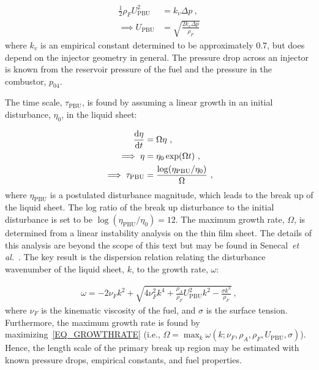 \begin{equation}
	\begin{aligned}
    	\frac{1}{2}\rho_FU_\mathrm{PBU}^2&=k_v\Delta p\ ,\\
        \implies U_\mathrm{PBU}&=\sqrt{\frac{2k_v\Delta p}{\rho_F}}
    \end{aligned}
\end{equation}
where $k_v$ is an empirical constant determined to be approximately 0.7, but does depend on the injector geometry in general. The pressure drop across an injector is known from the reservoir pressure of the fuel and the pressure in the combustor, $p_{04}$.

The time scale, $\tau_\mathrm{PBU}$, is found by assuming a linear growth in an initial disturbance, $\eta_0$, in the liquid sheet:

\begin{equation}
	\begin{aligned}
    	\frac{\d \eta}{\d t}&=\Omega\eta\ ,\\
    	\implies \eta&=\eta_0\exp(\Omega t)\ ,\\
        \implies \tau_\mathrm{PBU}&=\frac{\log(\eta_{\mathrm{PBU}}/\eta_0)}{\Omega}\ ,
    \end{aligned}
\end{equation}
where $\eta_\mathrm{PBU}$ is a postulated disturbance magnitude, which leads to the break up of the liquid sheet. The log ratio of the break up disturbance to the initial disturbance is set to be $\log(\eta_{\mathrm{PBU}}/\eta_0)=12$. The maximum growth rate, $\Omega$, is determined from a linear instability analysis on the thin film sheet. The details of this analysis are beyond the scope of this text but may be found in Senecal~\emph{et al.}~\cite{SENECAL_IJMF99}. The key result is the dispersion relation relating the disturbance wavenumber of the liquid sheet, $k$, to the growth rate, $\omega$:

\begin{equation}
	\label{EQ_GROWTHRATE}
	\begin{aligned}
    	\omega = -2\nu_F k^2+\sqrt{4\nu_F^2k^4+\frac{\rho_A}{\rho_F}U_\mathrm{PBU}^2k^2-\frac{\sigma k^3}{\rho_F}}\ ,
    \end{aligned}
\end{equation}
where $\nu_F$ is the kinematic viscosity of the fuel, and $\sigma$ is the surface tension. Furthermore, the maximum growth rate is found by maximizing~\cref{EQ_GROWTHRATE} (i.e., $\Omega=\max_k \omega(k;\nu_F,\rho_A,\rho_F, U_\mathrm{PBU},\sigma)$). Hence, the length scale of the primary break up region may be estimated with known pressure drops, empirical constants, and fuel properties. 

